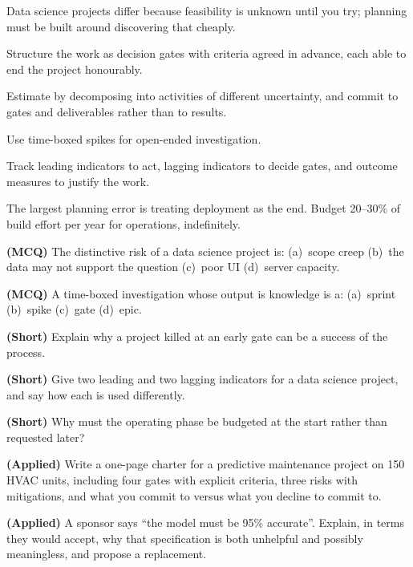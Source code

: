 \begin{chaptersummary}
\begin{tight}
  \item Data science projects differ because feasibility is unknown until you try;
        planning must be built around discovering that cheaply.
  \item Structure the work as decision gates with criteria agreed in advance, each
        able to end the project honourably.
  \item Estimate by decomposing into activities of different uncertainty, and commit
        to gates and deliverables rather than to results.
  \item Use time-boxed spikes for open-ended investigation.
  \item Track leading indicators to act, lagging indicators to decide gates, and
        outcome measures to justify the work.
  \item The largest planning error is treating deployment as the end. Budget 20--30\%
        of build effort per year for operations, indefinitely.
\end{tight}
\end{chaptersummary}

\begin{reviewq}
  \item \textbf{(MCQ)} The distinctive risk of a data science project is:
        (a)~scope creep (b)~the data may not support the question (c)~poor UI
        (d)~server capacity.
  \item \textbf{(MCQ)} A time-boxed investigation whose output is knowledge is a:
        (a)~sprint (b)~spike (c)~gate (d)~epic.
  \item \textbf{(Short)} Explain why a project killed at an early gate can be a
        success of the process.
  \item \textbf{(Short)} Give two leading and two lagging indicators for a data
        science project, and say how each is used differently.
  \item \textbf{(Short)} Why must the operating phase be budgeted at the start rather
        than requested later?
  \item \textbf{(Applied)} Write a one-page charter for a predictive maintenance
        project on 150 HVAC units, including four gates with explicit criteria, three
        risks with mitigations, and what you commit to versus what you decline to
        commit to.
  \item \textbf{(Applied)} A sponsor says ``the model must be 95\% accurate''.
        Explain, in terms they would accept, why that specification is both unhelpful
        and possibly meaningless, and propose a replacement.
\end{reviewq}
